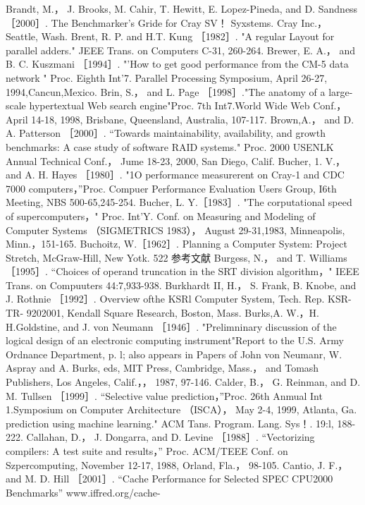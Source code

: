 Brandt, M.， J. Brooks, M. Cahir, T. Hewitt, E. Lopez-Pineda, and D. Sandness ［2000］. The Benchmarker's Gride for Cray SV！
Syxstems. Cray Inc.， Seattle, Wash.
Brent, R. P. and H.T. Kung ［1982］. "A regular Layout for parallel adders." JEEE Trans. on Computers C-31, 260-264.
Brewer, E. A.， and B. C. Kuszmani ［1994］. "'How to get good performance from the CM-5 data network " Proc. Eighth Int'7.
Parallel Processing Symposium, April 26-27, 1994,Cancun,Mexico.
Brin, S.， and L. Page ［1998］."The anatomy of a large-scale hypertextual Web search engine"Proc. 7th Int7.World Wide Web
Conf.， April 14-18, 1998, Brisbane, Queensland, Australia, 107-117.
Brown,A.， and D. A. Patterson ［2000］. “Towards maintainability, availability, and growth benchmarks: A case study of software
RAID systems." Proc. 2000 USENLK Annual Technical Conf.， Jume 18-23, 2000, San Diego, Calif.
Bucher, 1. V.， and A. H. Hayes ［1980］. "1O performance measurerent on Cray-1 and CDC 7000 computers，”Proc. Compuer
Performance Evaluation Users Group, I6th Meeting, NBS 500-65,245-254.
Bucher, L. Y.［1983］. "The corputational speed of supercomputers，" Proc. Int'Y. Conf. on Measuring and Modeling of Computer
Systems （SIGMETRICS 1983）， August 29-31,1983, Minneapolis, Minn.，151-165.
Buchoitz, W.［1962］. Planning a Computer System: Project Stretch, McGraw-Hill, New Yotk.
522
参考文献
Burgess, N.， and T. Williams ［1995］. “Choices of operand truncation in the SRT division algorithm，" IEEE Trans. on Compuuters
44:7,933-938.
Burkhardt II, H.， S. Frank, B. Knobe, and J. Rothnie ［1992］. Overview ofthe KSRl Computer System, Tech. Rep. KSR-TR-
9202001, Kendall Square Research, Boston, Mass.
Burks,A. W.，H. H.Goldstine, and J. von Neumann ［1946］. "Prelimninary discussion of the logical design of an electronic
computing instrument"Report to the U.S. Army Ordnance Department, p. l; also appears in Papers of John von Neumanr, W.
Aspray and A. Burks, eds, MIT Press, Cambridge, Mass.， and Tomash Publishers, Los Angeles, Calif.，， 1987, 97-146.
Calder, B.， G. Reinman, and D. M. Tullsen ［1999］. “Selective value prediction，”Proc. 26th Anmual Int 1.Symposium on
Computer Architecture （ISCA）， May 2-4, 1999, Atlanta, Ga.
prediction using machine learning." ACM Tans. Program. Lang. Sys！. 19:l, 188-222.
Callahan, D.， J. Dongarra, and D. Levine ［1988］. “Vectorizing compilers: A test suite and results，” Proc. ACM/TEEE Conf. on
Szpercomputing, November 12-17, 1988, Orland, Fla.， 98-105.
Cantio, J. F.， and M. D. Hill ［2001］. “Cache Performance for Selected SPEC CPU2000 Benchmarks” www.iffred.org/cache-
